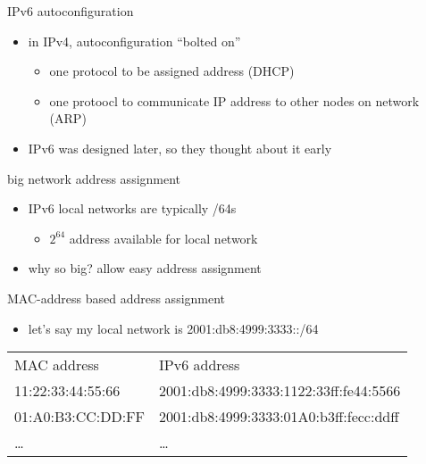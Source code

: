 \begin{frame}{IPv6 autoconfiguration}
    \begin{itemize}
    \item in IPv4, autoconfiguration ``bolted on''
        \begin{itemize}
        \item one protocol to be assigned address (DHCP)
        \item one protoocl to communicate IP address to other nodes on network (ARP)
        \end{itemize}
    \item IPv6 was designed later, so they thought about it early
    \end{itemize}
\end{frame}

\begin{frame}{big network address assignment}
    \begin{itemize}
    \item IPv6 local networks are typically /64s
        \begin{itemize}
        \item $2^{64}$ address available for local network
        \end{itemize}
    \item why so big? allow easy address assignment
    \end{itemize}
\end{frame}

\begin{frame}{MAC-address based address assignment}
    \begin{itemize}
    \item let's say my local network is 2001:db8:4999:3333::/64
    \end{itemize}
{\scriptsize
\begin{tabular}{ll}
MAC address & IPv6 address \\
11:22:33:44:55:66 & 2001:db8:4999:3333:1122:33ff:fe44:5566 \\
01:A0:B3:CC:DD:FF & 2001:db8:4999:3333:01A0:b3ff:fecc:ddff \\
\ldots & \ldots \\
\end{tabular}
}
\end{frame}
